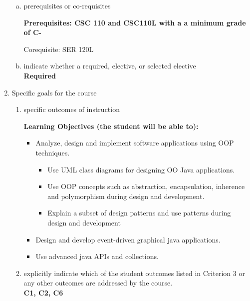 \begin{enumerate}[1.]
\begin{enumerate}[a.]
\item prerequisites or co-requisites\\
  {\bfseries
    Prerequisites: CSC 110 and CSC110L with a a minimum grade of C-

    Corequisite: SER 120L
  }

\item indicate whether a required, elective, or selected elective\\ %
  {\bfseries
    Required
  }

\end{enumerate}

\item Specific goals for the course
\begin{enumerate}
\item specific outcomes of instruction\\ %
  {\bfseries
    Learning Objectives (the student will be able to):
    \begin{itemize}
      \item Analyze, design and implement software applications using OOP techniques.
      \begin{itemize}
        \item Use UML class diagrams for designing OO Java applications.
        \item Use OOP concepts such as abstraction, encapsulation, inherence and polymorphism during design and development.
        \item Explain a subset of design patterns and use patterns during design and development
      \end{itemize}
      \item Design and develop event-driven graphical java applications.
      \item Use advanced java APIs and collections.
    \end{itemize}
  }

\item explicitly indicate which of the student outcomes listed in Criterion 3 or any other outcomes are addressed by the course.\\
  {\bfseries
    C1,
    C2,
    C6
  }
\end{enumerate}


\end{enumerate}
